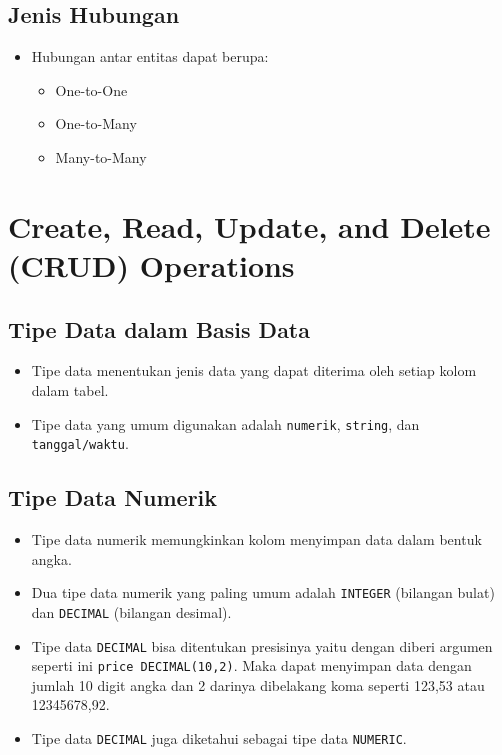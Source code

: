 \documentclass{article}
\begin{document}
\subsection{Jenis Hubungan}
\begin{itemize}
    \item Hubungan antar entitas dapat berupa:
          \begin{itemize}
              \item One-to-One
              \item One-to-Many
              \item Many-to-Many
          \end{itemize}
\end{itemize}
\newpage
\section{Create, Read, Update, and Delete (CRUD) Operations}
\subsection{Tipe Data dalam Basis Data}
\begin{itemize}
    \item Tipe data menentukan jenis data yang dapat diterima oleh setiap kolom dalam tabel.
    \item Tipe data yang umum digunakan adalah \texttt{numerik}, \texttt{string}, dan \texttt{tanggal/waktu}.
\end{itemize}

\subsection{Tipe Data Numerik}
\begin{itemize}
    \item Tipe data numerik memungkinkan kolom menyimpan data dalam bentuk angka.
    \item Dua tipe data numerik yang paling umum adalah \texttt{INTEGER} (bilangan bulat) dan \texttt{DECIMAL} (bilangan desimal).
    \item Tipe data \texttt{DECIMAL} bisa ditentukan presisinya yaitu dengan diberi argumen seperti ini \texttt{price DECIMAL(10,2)}. Maka dapat menyimpan data dengan jumlah 10 digit angka dan 2 darinya dibelakang koma seperti 123,53 atau 12345678,92.
    \item Tipe data \texttt{DECIMAL} juga diketahui sebagai tipe data \texttt{NUMERIC}.
\end{itemize}
\end{document}

